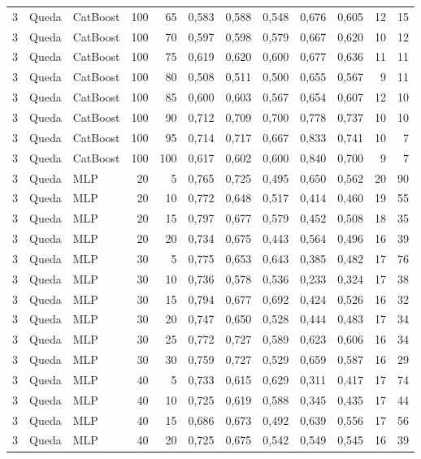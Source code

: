 \begin{longtable}{@{}rllrrrrrrrrr@{}}
3 & Queda & CatBoost & 100 & 65 & 0,583 & 0,588 & 0,548 & 0,676 & 0,605 & 12 & 15 \\
3 & Queda & CatBoost & 100 & 70 & 0,597 & 0,598 & 0,579 & 0,667 & 0,620 & 10 & 12 \\
3 & Queda & CatBoost & 100 & 75 & 0,619 & 0,620 & 0,600 & 0,677 & 0,636 & 11 & 11 \\
3 & Queda & CatBoost & 100 & 80 & 0,508 & 0,511 & 0,500 & 0,655 & 0,567 & 9 & 11 \\
3 & Queda & CatBoost & 100 & 85 & 0,600 & 0,603 & 0,567 & 0,654 & 0,607 & 12 & 10 \\
3 & Queda & CatBoost & 100 & 90 & 0,712 & 0,709 & 0,700 & 0,778 & 0,737 & 10 & 10 \\
3 & Queda & CatBoost & 100 & 95 & 0,714 & 0,717 & 0,667 & 0,833 & 0,741 & 10 & 7 \\
3 & Queda & CatBoost & 100 & 100 & 0,617 & 0,602 & 0,600 & 0,840 & 0,700 & 9 & 7 \\
3 & Queda & MLP & 20 & 5 & 0,765 & 0,725 & 0,495 & 0,650 & 0,562 & 20 & 90 \\
3 & Queda & MLP & 20 & 10 & 0,772 & 0,648 & 0,517 & 0,414 & 0,460 & 19 & 55 \\
3 & Queda & MLP & 20 & 15 & 0,797 & 0,677 & 0,579 & 0,452 & 0,508 & 18 & 35 \\
3 & Queda & MLP & 20 & 20 & 0,734 & 0,675 & 0,443 & 0,564 & 0,496 & 16 & 39 \\
3 & Queda & MLP & 30 & 5 & 0,775 & 0,653 & 0,643 & 0,385 & 0,482 & 17 & 76 \\
3 & Queda & MLP & 30 & 10 & 0,736 & 0,578 & 0,536 & 0,233 & 0,324 & 17 & 38 \\
3 & Queda & MLP & 30 & 15 & 0,794 & 0,677 & 0,692 & 0,424 & 0,526 & 16 & 32 \\
3 & Queda & MLP & 30 & 20 & 0,747 & 0,650 & 0,528 & 0,444 & 0,483 & 17 & 34 \\
3 & Queda & MLP & 30 & 25 & 0,772 & 0,727 & 0,589 & 0,623 & 0,606 & 16 & 34 \\
3 & Queda & MLP & 30 & 30 & 0,759 & 0,727 & 0,529 & 0,659 & 0,587 & 16 & 29 \\
3 & Queda & MLP & 40 & 5 & 0,733 & 0,615 & 0,629 & 0,311 & 0,417 & 17 & 74 \\
3 & Queda & MLP & 40 & 10 & 0,725 & 0,619 & 0,588 & 0,345 & 0,435 & 17 & 44 \\
3 & Queda & MLP & 40 & 15 & 0,686 & 0,673 & 0,492 & 0,639 & 0,556 & 17 & 56 \\
3 & Queda & MLP & 40 & 20 & 0,725 & 0,675 & 0,542 & 0,549 & 0,545 & 16 & 39 \\

\end{longtable}
